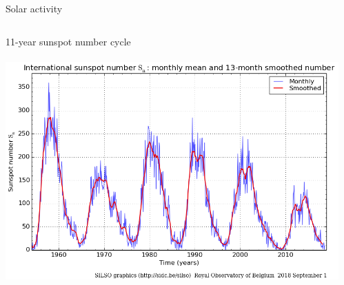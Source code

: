 \begin{frame}[plain,c]{Solar activity}{}
\begin{columns}[c]
		
		11-year sunspot number cycle\\\ 
		\includegraphics[width=\textwidth]{../figures_of_others/images/ROB_SILSO_SSN_wolfmms_cropped.png}

		\vfill\hfill \hyperlink{butterfly}{\beamerskipbutton{}}
		
	\end{columns}
\end{frame}
